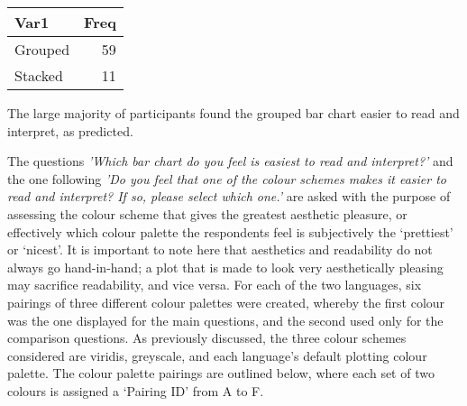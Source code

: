 \documentclass[
]{article}
\newenvironment{Shaded}{\begin{snugshade}}{\end{snugshade}}
\newcommand{\ControlFlowTok}[1]{\textcolor[rgb]{0.13,0.29,0.53}{\textbf{#1}}}
\newcommand{\DataTypeTok}[1]{\textcolor[rgb]{0.13,0.29,0.53}{#1}}
\newcommand{\DecValTok}[1]{\textcolor[rgb]{0.00,0.00,0.81}{#1}}
\newcommand{\KeywordTok}[1]{\textcolor[rgb]{0.13,0.29,0.53}{\textbf{#1}}}
\newcommand{\NormalTok}[1]{#1}
\newcommand{\OperatorTok}[1]{\textcolor[rgb]{0.81,0.36,0.00}{\textbf{#1}}}
\newcommand{\StringTok}[1]{\textcolor[rgb]{0.31,0.60,0.02}{#1}}
\begin{document}
\begin{Shaded}
\end{Shaded}

\begin{table}[!h]
\centering
\begin{tabular}{l|r}
\hline
Var1 & Freq\\
\hline
Grouped & 59\\
\hline
Stacked & 11\\
\hline
\end{tabular}
\end{table}

The large majority of participants found the grouped bar chart easier to
read and interpret, as predicted.

The questions
\textit{'Which bar chart do you feel is easiest to read and interpret?'}
and the one following
\textit{'Do you feel that one of the colour schemes makes it easier to read and interpret? If so, please select which one.'}
are asked with the purpose of assessing the colour scheme that gives the
greatest aesthetic pleasure, or effectively which colour palette the
respondents feel is subjectively the `prettiest' or `nicest'. It is
important to note here that aesthetics and readability do not always go
hand-in-hand; a plot that is made to look very aesthetically pleasing
may sacrifice readability, and vice versa. For each of the two
languages, six pairings of three different colour palettes were created,
whereby the first colour was the one displayed for the main questions,
and the second used only for the comparison questions. As previously
discussed, the three colour schemes considered are viridis, greyscale,
and each language's default plotting colour palette. The colour palette
pairings are outlined below, where each set of two colours is assigned a
`Pairing ID' from A to F.
\end{document}
